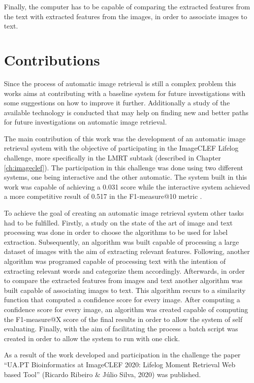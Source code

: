 Finally, the computer has to be capable of comparing the extracted features from the text with extracted features from the images, in order to associate images to text.

\section{Contributions}

Since the process of automatic image retrieval is still a complex problem this works aims at contributing with a baseline system for future investigations with some suggestions on how to improve it further. Additionally a study of the available technology is conducted that may help on finding new and better paths for future investigations on automatic image retrieval.

The main contribution of this work was the development of an automatic image retrieval system with the objective of participating in the ImageCLEF Lifelog challenge, more specifically in the LMRT subtask (described in Chapter \ref{ch:imageclef}). The participation in this challenge was done using two different systems, one being interactive and the other automatic. The system built in this work was capable of achieving a 0.031 score while the interactive system achieved a more competitive result of 0.517 in the F1-measure@10 metric \cite{Ribeiro2020}.


To achieve the goal of creating an automatic image retrieval system other tasks had to be fulfilled. Firstly, a study on the state of the art of image and text processing was done in order to choose the algorithms to be used for label extraction. Subsequently, an algorithm was built capable of processing a large dataset of images  with the aim of extracting relevant features. Following, another algorithm was programed capable of processing text with the intention of extracting relevant words and categorize them accordingly. Afterwards, in order to compare the extracted features from images and text another algorithm was built capable of associating images to text. This algorithm recurs to a similarity function that computed a confidence score for every image. After computing a confidence score for every image, an algorithm was created capable of computing the F1-measure@X score of the final results in order to allow the system of self evaluating. Finally, with the aim of facilitating the process a batch script was created in order to allow the system to run with one click.

As a result of the work developed and participation in the challenge the paper ``UA.PT Bioinformatics at ImageCLEF 2020: Lifelog Moment Retrieval Web based Tool” (Ricardo Ribeiro \& Júlio Silva, 2020) was published.
